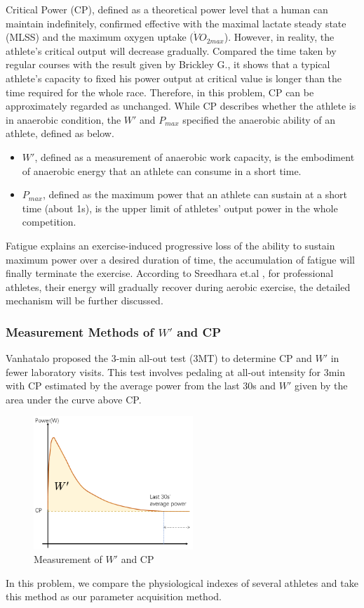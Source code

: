 \documentclass{mcmthesis}
\begin{document}
Critical Power (CP), defined as a theoretical power level that a human can maintain indefinitely\cite{monod_work_1965}, confirmed effective with the maximal lactate steady state (MLSS) and the maximum oxygen uptake ($\dot{V}O_{2max}$)\cite{possamai_agreement_2021}. However, in reality, the athlete's critical output will decrease gradually. Compared the time taken by regular courses with the result given by Brickley G.\cite{brickley_physiological_2002}, it shows that a typical athlete's capacity to fixed his power output at critical value is longer than the time required for the whole race. Therefore, in this problem, CP can be approximately regarded as unchanged\cite{clark_comparative_2021}. While CP describes whether the athlete is in anaerobic condition, the ${W}'$ and $P_{max}$ specified the anaerobic ability of an athlete\cite{tipton_exercise_2001}, defined as below.
\begin{itemize}
    \item ${W}'$, defined as a measurement of anaerobic work capacity, is the embodiment of anaerobic energy that an athlete can consume in a short time.
    \item $P_{max}$, defined as the maximum power that an athlete can sustain at a short time (about 1s), is the upper limit of athletes' output power in the whole competition.
\end{itemize}

\par 
Fatigue explains an exercise-induced progressive loss of the ability to sustain maximum power over a desired duration of time\cite{davis_mechanisms_2010}, the accumulation of fatigue will finally terminate the exercise. According to Sreedhara et.al \cite{sreedhara_survey_2019}, for professional athletes, their energy will gradually recover during aerobic exercise, the detailed mechanism will be further discussed.
\subsubsection{Measurement Methods of ${W}'$ and CP}
 Vanhatalo\cite{vanhatalo_determination_2007} proposed the 3-min all-out test (3MT) to determine CP and ${W}'$ in fewer laboratory visits. This test involves pedaling at all-out intensity for 3min with CP estimated by the average power from the last 30s and ${W}'$ given by the area under the curve above CP. 
\begin{figure}[H]
\small
\centering
\includegraphics[width=6cm]{mcmthesis/figures/define of cp.png}
\caption{Measurement of ${W}'$ and CP} 
\end{figure}
In this problem, we compare the physiological indexes of several athletes and take this method as our parameter acquisition method.
\end{document}
